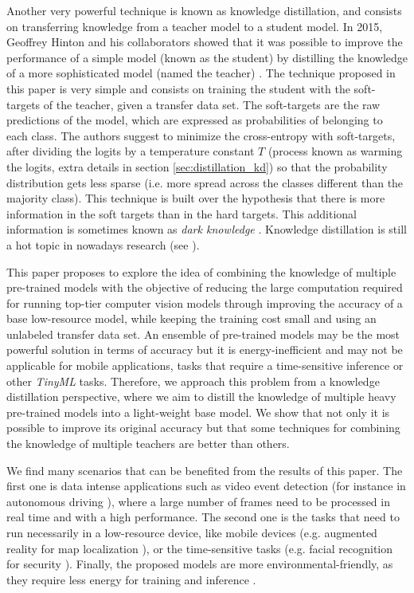 Another very powerful technique is known as knowledge distillation, and consists on transferring knowledge from a teacher model to a student model. In 2015, Geoffrey Hinton and his collaborators showed that it was possible to improve the performance of a simple model (known as the student) by distilling the knowledge of a more sophisticated model (named the teacher) \cite{hinton2015}. The technique proposed in this paper is very simple and consists on training the student with the soft-targets of the teacher, given a transfer data set. The soft-targets are the raw predictions of the model, which are expressed as probabilities of belonging to each class. The authors suggest to minimize the cross-entropy with soft-targets, after dividing the logits by a temperature constant $T$ (process known as warming the logits, extra details in section \ref{sec:distillation_kd}) so that the probability distribution gets less sparse (i.e. more spread across the classes different than the majority class). This technique is built over the hypothesis that there is more information in the soft targets than in the hard targets. This additional information is sometimes known as \textit{dark knowledge} \cite{gou2020}. Knowledge distillation is still a hot topic in nowadays research (see \cite{tan2021, zhao2021, lee2021}).


This paper proposes to explore the idea of combining the knowledge of multiple pre-trained models with the objective of reducing the large computation required for running top-tier computer vision models through improving the accuracy of a base low-resource model, while keeping the training cost small and using an unlabeled transfer data set. 	An ensemble of pre-trained models may be the most powerful solution in terms of accuracy but it is energy-inefficient and may not be applicable for mobile applications, tasks that require a time-sensitive inference \cite{sanchez2020} or other \textit{TinyML} tasks. Therefore, we approach this problem from a knowledge distillation perspective, where we aim to distill the knowledge of multiple heavy pre-trained models into a light-weight base model. We show that not only it is possible to improve its original accuracy but that some techniques for combining the knowledge of multiple teachers are better than others.

We find many scenarios that can be benefited from the results of this paper. The first one is data intense applications such as video event detection \cite{chakraborty2021} (for instance in autonomous driving \cite{swaminathan2019}), where a large number of frames need to be processed in real time and with a high performance. The second one is the tasks that need to run necessarily in a low-resource device, like mobile devices (e.g. augmented reality for map localization \cite{limmer2017}), or the time-sensitive tasks (e.g. facial recognition for security \cite{aung2021}). Finally, the proposed models are more environmental-friendly, as they require less energy for training and inference \cite{wu2022sustainable}.

